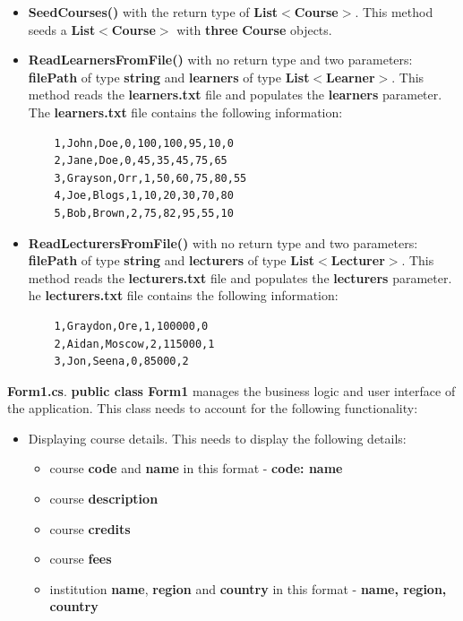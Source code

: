 \documentclass{article}
\begin{document}
\begin{itemize}
\begin{itemize}
\begin{itemize}
            \item \textbf{SeedCourses()} with the return type of \textbf{List$<$Course$>$}. This method seeds a \textbf{List$<$Course$>$} with \textbf{three} \textbf{Course} objects. 
            \item \textbf{ReadLearnersFromFile()} with no return type and two parameters: \textbf{filePath} of type \textbf{string} and \textbf{learners} of type \textbf{List$<$Learner$>$}. This method reads the \textbf{learners.txt} file and populates the \textbf{learners} parameter. The \textbf{learners.txt} file contains the following information:\\
            \begin{verbatim}
	1,John,Doe,0,100,100,95,10,0
	2,Jane,Doe,0,45,35,45,75,65
	3,Grayson,Orr,1,50,60,75,80,55
	4,Joe,Blogs,1,10,20,30,70,80
	5,Bob,Brown,2,75,82,95,55,10
            \end{verbatim}
            \item \textbf{ReadLecturersFromFile()} with no return type and two parameters: \textbf{filePath} of type \textbf{string} and \textbf{lecturers} of type \textbf{List$<$Lecturer$>$}. This method reads the \textbf{lecturers.txt} file and populates the \textbf{lecturers} parameter. he \textbf{lecturers.txt} file contains the following information:\\
            \begin{verbatim}
	1,Graydon,Ore,1,100000,0
	2,Aidan,Moscow,2,115000,1
	3,Jon,Seena,0,85000,2
            \end{verbatim}
        \end{itemize}
        \textbf{Form1.cs}. \textbf{public class Form1} manages the business logic and user interface of the application. This class needs to account for the following functionality:
        \begin{itemize}
            \item Displaying course details. This needs to display the following details:
            \begin{itemize}
                \item course \textbf{code} and \textbf{name} in this format - \textbf{code: name}
                \item course \textbf{description}
                \item course \textbf{credits}
                \item course \textbf{fees}
                \item institution \textbf{name}, \textbf{region} and \textbf{country} in this format - \textbf{name, region, country}

\end{itemize}
\end{itemize}
\end{itemize}
\end{itemize}
\end{document}
